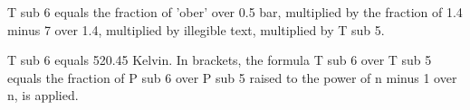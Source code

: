 T sub 6 equals the fraction of 'ober' over 0.5 bar, multiplied by the fraction of 1.4 minus 7 over 1.4, multiplied by illegible text, multiplied by T sub 5.

T sub 6 equals 520.45 Kelvin. In brackets, the formula T sub 6 over T sub 5 equals the fraction of P sub 6 over P sub 5 raised to the power of n minus 1 over n, is applied.